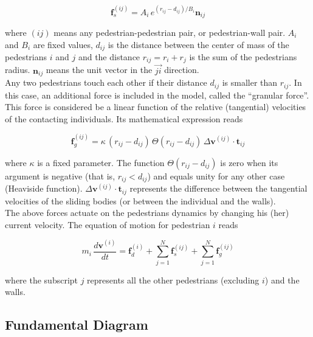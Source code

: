 \begin{equation}
        \mathbf{f}_s^{(ij)} = A_i\,e^{(r_{ij}-d_{ij})/B_i}\mathbf{n}_{ij} 
        \label{social}
\end{equation}

\noindent where $(ij)$ means any pedestrian-pedestrian pair, or pedestrian-wall 
pair. $A_i$ and $B_i$ are fixed values, $d_{ij}$ is the distance between  the 
center of mass of the pedestrians $i$ and $j$ and the distance $r_{ij}=r_i+r_j$ 
is the sum of the pedestrians radius. $\mathbf{n}_{ij}$ means the unit vector in 
the $\vec{ji}$ direction. \\

Any two pedestrians touch each other if their distance $d_{ij}$ is smaller than 
$r_{ij}$.  In this case, an additional force is included in the model, called 
the ``granular force''. This force is considered be a linear function of the 
relative (tangential) velocities of the contacting individuals. Its mathematical 
expression reads 

\begin{equation}
        \mathbf{f}_g^{(ij)} = 
\kappa\,(r_{ij}-d_{ij})\,\Theta(r_{ij}-d_{ij})\,\Delta
\mathbf{v}^{(ij)}\cdot\mathbf{t}_{ij} 
        \label{granular}
\end{equation}

\noindent where $\kappa$ is a fixed parameter. The function 
$\Theta(r_{ij}-d_{ij})$ is zero when its argument is negative (that is, 
$r_{ij}<d_{ij}$) and equals unity for any other case (Heaviside function). 
$\Delta\mathbf{v}^{(ij)}\cdot\mathbf{t}_{ij}$ represents the difference between 
the tangential velocities of the sliding bodies (or between the individual and 
the walls).   \\

The above forces actuate on the pedestrians dynamics by changing his (her) 
current velocity. The equation of motion for pedestrian $i$ reads

\begin{equation}
m_i\,\displaystyle\frac{d\mathbf{v}^{(i)}}{dt}=\mathbf{f}_d^{(i)}
+\displaystyle\sum_{j=1}^{N}\displaystyle\mathbf{f}_s^{(ij)}
+\displaystyle\sum_ {
j=1}^{N}\mathbf{f}_g^{(ij)}\label{eq_mov}
\end{equation}

\noindent where the subscript $j$ represents all the other pedestrians 
(excluding $i$) and the walls. \\

\subsection{\label{fundamental-diagram} Fundamental Diagram}



